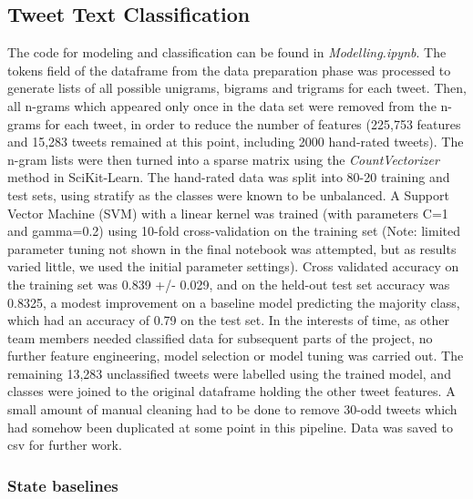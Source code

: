 \documentclass[sigconf]{acmart}
\begin{document}

\subsection{Tweet Text Classification}
 
The code for modeling and classification can be found in \emph{Modelling.ipynb}. 
The tokens field of the dataframe from the data preparation phase was processed 
to generate lists of all possible unigrams, bigrams and trigrams for each tweet. 
Then, all n-grams which appeared only once in the data set were removed from 
the n-grams for each tweet, in order to reduce the number of features (225,753 
features and 15,283 tweets remained at this point, including 2000 hand-rated
tweets). The n-gram lists were then turned into a sparse matrix using the 
\emph{CountVectorizer} method in SciKit-Learn. The hand-rated data was split 
into 80-20 training and test sets, using stratify as the classes were known to 
be unbalanced. A Support Vector Machine (SVM) with a linear kernel was trained 
(with parameters C=1 and gamma=0.2) using 10-fold cross-validation on the 
training set (Note: limited parameter tuning not shown in the final notebook was 
attempted, but as results varied little, we used the initial parameter settings). 
Cross validated accuracy on the training set was 0.839 +/- 0.029, and on the 
held-out test set accuracy was 0.8325, a modest improvement on a baseline model 
predicting the majority class, which had an accuracy of 0.79 on the test set. 
In the interests of time, as other team members needed classified data for 
subsequent parts of the project, no further feature engineering, model selection 
or model tuning was carried out. The remaining 13,283 unclassified tweets were 
labelled using the trained model, and classes were joined to the original 
dataframe holding the other tweet features. A small amount of manual cleaning 
had to be done to remove 30-odd tweets which had somehow been duplicated at 
some point in this pipeline. Data was saved to csv for further work.

 
\subsubsection{State baselines}
 
\end{document}
